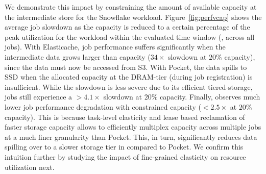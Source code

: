  We demonstrate this impact by constraining the amount of available capacity at the intermediate store for the Snowflake workload. Figure~\ref{fig:perfvcap} shows the average job slowdown as the capacity is reduced to a certain percentage of the peak utilization for the workload within the evaluated time window (\ie, across all jobs). With Elasticache, job performance suffers significantly when the intermediate data grows larger than capacity ($34\times$ slowdown at $20$\% capacity), since the data must now be accessed from S3. With Pocket, the data spills to SSD when the allocated capacity at the DRAM-tier (during job registration) is insufficient. While the slowdown is less severe due to its efficient tiered-storage, jobs still experience a $>4.1\times$ slowdown at $20$\% capacity. Finally, \jiffy observes much lower job performance degradation with constrained capacity ($<2.5\times$ at $20$\% capacity). This is because task-level elasticity and lease based reclamation of faster storage capacity allows \jiffy to efficiently multiplex capacity across multiple jobs at a much finer granularity than Pocket. This, in turn, significantly reduces data spilling over to a slower storage tier in \jiffy compared to Pocket. We confirm this intuition further by studying the impact of fine-grained elasticity on resource utilization next. %

